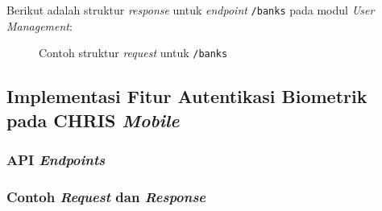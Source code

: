 Berikut adalah struktur \textit{response} untuk \textit{endpoint} \texttt{/banks} pada modul \textit{User Management}:
\begin{figure}
    \centering
    \caption{Contoh struktur \textit{request} untuk \texttt{/banks}}
    \label{fig:request_banks}
\end{figure}



\subsection{Implementasi Fitur Autentikasi Biometrik pada CHRIS \textit{Mobile}}
\subsubsection{API \textit{Endpoints}}
\subsubsection{Contoh \textit{Request} dan \textit{Response}}






